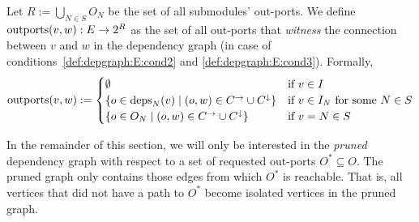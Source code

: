 \documentclass[paper=letter,fontsize=11pt,captions=tableheading]{scrartcl}
\numberwithin{equation}{section}
\newcommand{\pow}[1]{2^{#1}}
\theoremstyle{algorithm}
\theoremstyle{plain}
\theoremstyle{nonumberplain}
\begin{document}
Let $R := \bigcup_{N \in S} O_N$ be the set of all submodules' out-ports. We define $\outports(v,w): E \to \pow R$ as the set of all out-ports that \emph{witness} the connection between $v$ and $w$ in the dependency graph (in case of conditions~\eqref{def:depgraph:E:cond2} and \eqref{def:depgraph:E:cond3}). Formally,
\begin{equation*}
	\operatorname{outports}(v,w) := \begin{cases}
		\emptyset & \text{if $v \in I$} \\
		\{ o \in \operatorname{deps}_N(v) \mid (o,w) \in C^{\to} \cup C^{\downarrow} \} & \text{if $v \in I_N$ for some $N \in S$} \\
		\{ o \in O_N \mid (o, w) \in C^{\to} \cup C^{\downarrow} \} & \text{if $v = N \in S$}
	\end{cases}
\end{equation*}

In the remainder of this section, we will only be interested in the \emph{pruned} dependency graph with respect to a set of requested out-ports $O^* \subseteq O$. The pruned graph only contains those edges from which $O^*$ is reachable. That is, all vertices that did not have a path to $O^*$ become isolated vertices in the pruned graph.
\end{document}

